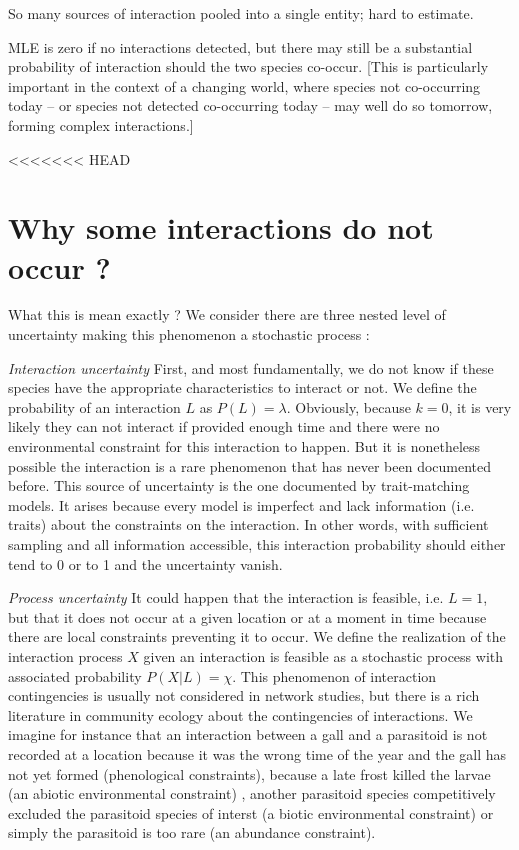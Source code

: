 \documentclass[12pt]{article}
\begin{document}
So many sources of interaction pooled into a single entity; hard to estimate.

MLE is zero if no interactions detected, but there may still be a substantial probability of interaction should the two species co-occur. [This is particularly important in the context of a changing world, where species not co-occurring today – or species not detected co-occurring today – may well do so tomorrow, forming complex interactions.]




<<<<<<< HEAD


\section*{Why some interactions do not occur ?}

What this is mean exactly ? We consider there are three nested level of uncertainty making this phenomenon a stochastic process :  

\textit{Interaction uncertainty} First, and most fundamentally, we do not know if these species have the appropriate characteristics to interact or not. We define the probability of an interaction $L$ as $P(L)=\lambda$. Obviously, because $k=0$, it is very likely they can not interact if provided enough time and there were no environmental constraint for this interaction to happen. But it is nonetheless possible the interaction is a rare phenomenon that has never been documented before. This source of uncertainty is the one documented by trait-matching models. It arises because every model is imperfect and lack information (i.e. traits) about the constraints on the interaction. In other words, with sufficient sampling and all information accessible, this interaction probability should either tend to 0 or to 1 and the uncertainty vanish.  

\textit{Process uncertainty} It could happen that the interaction is feasible, i.e. $L=1$, but that it does not occur at a given location or at a moment in time because there are local constraints preventing it to occur. We define the realization of the interaction process $X$ given an interaction is feasible as a stochastic process with associated probability $P(X|L)=\chi$. This phenomenon of interaction contingencies is usually not considered in network studies, but there is a rich literature in community ecology about the contingencies of interactions. We imagine for instance that an interaction between a gall and a parasitoid is not recorded at a location because it was the wrong time of the year and the gall has not yet formed (phenological constraints), because a late frost killed the larvae (an abiotic environmental constraint) , another parasitoid species competitively excluded the parasitoid species of interst (a biotic environmental constraint) or simply the parasitoid is too rare (an abundance constraint). 
\end{document}
